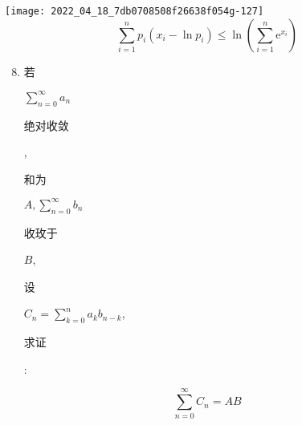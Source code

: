 \documentclass[10pt]{article}
\begin{document}
\texttt{[image: 2022\_04\_18\_7db0708508f26638f054g-127]}
$$
\sum_{i=1}^{n} p_{i}\left(x_{i}-\ln p_{i}\right) \leq \ln \left(\sum_{i=1}^{n} \mathrm{e}^{x_{i}}\right)
$$

\begin{enumerate}
  \setcounter{enumi}{7}
  \item \begin{CJK}{UTF8}{mj}若\end{CJK} $\sum_{n=0}^{\infty} a_{n}$ \begin{CJK}{UTF8}{mj}绝对收敛\end{CJK}, \begin{CJK}{UTF8}{mj}和为\end{CJK} $A, \sum_{n=0}^{\infty} b_{n}$ \begin{CJK}{UTF8}{mj}收玫于\end{CJK} $B$, \begin{CJK}{UTF8}{mj}设\end{CJK} $C_{n}=\sum_{k=0}^{n} a_{k} b_{n-k}$, \begin{CJK}{UTF8}{mj}求证\end{CJK}:
\end{enumerate}
$$
\sum_{n=0}^{\infty} C_{n}=A B
$$
\end{document}
